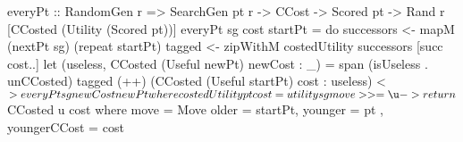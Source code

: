 everyPt :: RandomGen r
        => SearchGen pt r -> CCost -> Scored pt
        -> Rand r [CCosted (Utility (Scored pt))]
everyPt sg cost startPt = do
  successors <- mapM (nextPt sg) (repeat startPt)
  tagged <- zipWithM costedUtility successors [succ cost..]
  let (useless, CCosted (Useful newPt) newCost : _) =
                      span (isUseless . unCCosted) tagged
  (++) (CCosted (Useful startPt) cost : useless) <$>
                                  everyPt sg newCost newPt
 where costedUtility pt cost =
         utility sg move >>= \u -> return $ CCosted u cost
        where move = Move { older = startPt, younger = pt
                          , youngerCCost = cost }
